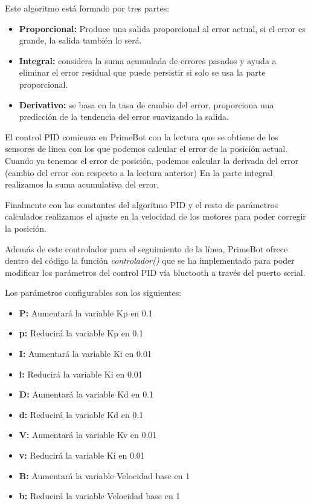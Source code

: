  Este algoritmo está formado por tres partes:
 \begin{itemize}
\tightlist
\item
  \textbf{Proporcional:} Produce una salida proporcional al error actual, si el error es grande, la salida también lo será.
\item
  \textbf{Integral:} considera la suma acumulada de errores pasados y ayuda a eliminar el error residual que puede persistir si solo se usa la parte proporcional.
\item
  \textbf{Derivativo:} se basa en la tasa de cambio del error, proporciona una predicción de la tendencia del error suavizando la salida.
\end{itemize}

El control PID comienza en PrimeBot con la lectura que se obtiene de los sensores de línea con los que podemos calcular el error de la posición actual.
Cuando ya tenemos el error de posición, podemos calcular la derivada del error (cambio del error con respecto a la lectura anterior)
En la parte integral realizamos la suma acumulativa del error.

Finalmente con las constantes del algoritmo PID y el resto de parámetros calculados realizamos el ajuste en la velocidad de los motores para poder corregir la posición.

Además de este controlador para el seguimiento de la línea, PrimeBot ofrece dentro del código la función \emph{controlador()} que se ha implementado para poder modificar los parámetros del control PID vía bluetooth a través del puerto serial.

Los parámetros configurables son los siguientes:

\begin{itemize}
\tightlist
\item
  \textbf{P:} Aumentará la variable Kp en 0.1
  \item
  \textbf{p:} Reducirá la variable Kp en 0.1
  \item
  \textbf{I:} Aumentará la variable Ki en 0.01
   \item
  \textbf{i:} Reducirá la variable Ki en 0.01
   \item
  \textbf{D:} Aumentará la variable Kd en 0.1
   \item
  \textbf{d:} Reducirá la variable Kd en 0.1
   \item
  \textbf{V:} Aumentará la variable Kv en 0.01
   \item
  \textbf{v:} Reducirá la variable Ki en 0.01
   \item
  \textbf{B:} Aumentará la variable Velocidad base en 1
   \item
  \textbf{b:} Reducirá la variable Velocidad base en 1
\end{itemize}

